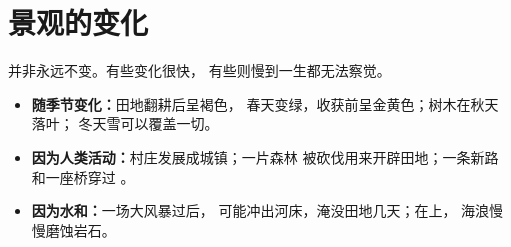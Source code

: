 \section{景观的变化}

并非永远不变。有些变化很快，
有些则慢到一生都无法察觉。
\begin{itemize}
  \item \textbf{随季节变化：}田地翻耕后呈褐色，
        春天变绿，收获前呈金黄色；树木在秋天落叶；
        冬天雪可以覆盖一切。
  \item \textbf{因为人类活动：}村庄发展成城镇；一片森林
        被砍伐用来开辟田地；一条新路和一座桥穿过
        。
  \item \textbf{因为水和：}一场大风暴过后，
        可能冲出河床，淹没田地几天；在上，
        海浪慢慢磨蚀岩石。
\end{itemize}

